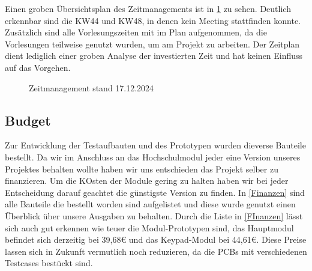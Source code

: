 
Einen groben Übersichtsplan des Zeitmanagements ist in \ref{zeitplan} zu sehen. Deutlich erkennbar sind die KW44 und KW48, in denen kein Meeting stattfinden konnte. Zusätzlich sind alle Vorlesungszeiten mit im Plan aufgenommen, da die Vorlesungen teilweise genutzt wurden, um am Projekt zu arbeiten. Der Zeitplan dient lediglich einer groben Analyse der investierten Zeit und hat keinen Einfluss auf das Vorgehen.

\begin{figure}[H]
    \centering    
    \caption{Zeitmanagement stand 17.12.2024}
    \label{zeitplan}
\end{figure}


\subsection{Budget}
Zur Entwicklung der Testaufbauten und des Prototypen wurden dieverse Bauteile bestellt. Da wir im Anschluss an das Hochschulmodul jeder eine Version unseres Projektes behalten wollte haben wir uns entschieden das Projekt selber zu finanzieren.
Um die KOsten der Module gering zu halten haben wir bei jeder Entscheidung darauf geachtet die günstigste Version zu finden. In \ref{Finanzen} sind alle Bauteile die bestellt worden sind aufgelistet und diese wurde genutzt einen Überblick über unsere Ausgaben zu behalten. Durch die Liste in \ref{FInanzen} lässt sich auch gut erkennen wie teuer die Modul-Prototypen sind, das Hauptmodul befindet sich derzeitig bei 39,68€ und das Keypad-Modul bei 44,61€. Diese Preise lassen sich in Zukunft vermutlich noch reduzieren, da die PCBs mit verschiedenen Testcases bestückt sind. 

